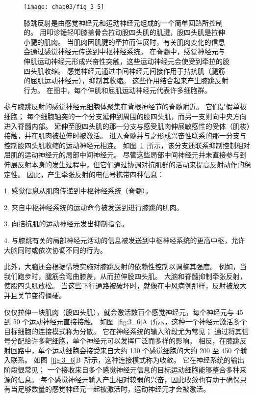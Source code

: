 \begin{figure}[htbp]
	\centering
	\texttt{[image: chap03/fig\_3\_5]}
	\caption{膝跳反射是由感觉神经元和运动神经元组成的一个简单回路所控制的。
		用叩诊锤轻叩膝盖骨会拉动股四头肌的肌腱，股四头肌是拉伸小腿的肌肉。
		当肌肉因肌腱的牵拉而伸展时，有关肌肉变化的信息会通过感觉神经元传送到中枢神经系统。
		在脊髓中，感觉神经元与伸肌运动神经元形成兴奋性突触，这些运动神经元会使受到牵拉的股四头肌收缩。 
		感觉神经元通过中间神经元间接作用于拮抗肌（腿筋的屈肌运动神经元），抑制其收缩。
		这些作用结合起来产生膝跳反射行为。 
		在图中，每个伸肌和屈肌运动神经元代表许多细胞群。}
	\label{fig:3_5}
\end{figure}


参与膝跳反射的感觉神经元细胞体聚集在背根神经节的脊髓附近。
它们是假单极细胞；
每个细胞轴突的一个分支延伸到周围的股四头肌，而另一支则向中央方向进入脊髓内部。
延伸至股四头肌的那一分支与感受肌肉伸展敏感性的受体（肌梭）接触，并在肌肉被拉伸时被激活。
进入脊髓并与之形成兴奋性联系的那一分支与控制股四头肌收缩的运动神经元相连。
如图~\ref{fig:3_5}~所示，该分支还联系抑制控制相对屈肌的运动神经元的局部中间神经元。 
尽管这些局部中间神经元并未直接参与到伸展反射本身的发生过程中，但它们通过协调对抗肌群的活动来提高反射动作的稳定性。
因此，产生牵张反射的电信号携带四种信息：

1. 感觉信息从肌肉传递到中枢神经系统（脊髓）。

2. 来自中枢神经系统的运动命令被发送到进行膝跳的肌肉。

3. 向拮抗肌的运动神经元发出抑制指令。

4. 与膝跳有关的局部神经元活动的信息被发送到中枢神经系统的更高中枢，允许大脑同时或依次协调不同的行为。


此外，大脑还会根据情境实施对膝跳反射的依赖性控制以调整其强度。
例如，当我们跑步时，腿筋会弯曲膝盖，从而拉伸股四头肌。
大脑和脊髓抑制牵张反射，使股四头肌放松。
当这些下行通路被破坏时，就像在中风病例那样，反射被放大并且关节变得僵硬。


仅仅拉伸一块肌肉（股四头肌），就会激活数百个感觉神经元，每个神经元与 45 到 50 个运动神经元直接接触。
如图~\ref{fig:3_6}A~所示，这种一个神经元激活多个目标细胞的连接模式称为分散。 
它在神经系统的输入阶段尤为常见；
通过将其信号分配给许多靶细胞，单个神经元可以发挥广泛而多样的影响。 
相反，在膝跳反射回路中，单个运动细胞会接受来自大约 130 个感觉细胞的大约 200 至 450 个输入联系。
如图~\ref{fig:3_6}B~所示，这种连接模式称为收敛。 
它在神经系统的输出阶段很常见； 一个接收来自多个感觉神经元信息的目标运动细胞能够整合多种来源的信息。
每个感觉神经元输入产生相对较弱的兴奋，因此收敛也有助于确保只有当足够数量的感觉神经元一起被激活时，运动神经元才会被激活。


